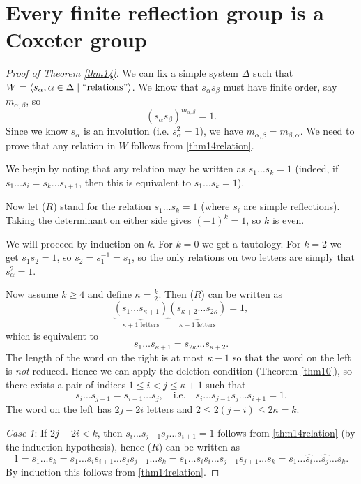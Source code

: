 \section{Every finite reflection group is a Coxeter group}

\begin{proof}[Proof of Theorem \ref{thm14}]
We can fix a simple system $\Delta$ such that
$W = \langle s_\alpha, \alpha \in \Delta \mid \text{``relations''} \rangle$. We know
that $s_\alpha s_\beta$ must have finite order, say $m_{\alpha,\beta}$, so
\begin{equation} \label{thm14relation}
(s_\alpha s_\beta)^{m_{\alpha, \beta}} = 1. %
\end{equation}
Since we know $s_\alpha$ is an
involution (i.e. $s_\alpha^2 = 1$), we have $m_{\alpha, \beta} = m_{\beta, \alpha}$.
We need to prove that any relation in $W$ follows from \eqref{thm14relation}.

We begin by noting that any relation may be written as $s_1 \dots s_k = 1$
(indeed, if $s_1 \dots s_i = s_k \dots s_{i+1}$, then this is equivalent to
$s_1 \dots s_k = 1$).

Now let ($R$) stand for the relation $s_1 \dots s_k = 1$ (where $s_i$ are simple
reflections). Taking the determinant on either side gives $(-1)^k = 1$, so $k$
is even.

We will proceed by induction on $k$. For $k = 0$ we get a tautology.
For $k = 2$ we get $s_1 s_2 = 1$, so $s_2 = s_1^{-1} = s_1$, so the only
relations on two letters are simply that $s_\alpha^2 = 1$.

Now assume $k \geq 4$ and define $\kappa = \frac{k}{2}$. Then ($R$) can be
written as
\[
    \underbrace{(s_1 \dots s_{\kappa+1})}_{\kappa+1 \text{ letters}}
    \underbrace{(s_{\kappa+2} \dots s_{2 \kappa})}_{\kappa-1 \text{ letters}} = 1,
\]
which is equivalent to
\[
    s_1 \dots s_{\kappa+1} = s_{2 \kappa} \dots s_{\kappa + 2}.
\]
The length of the word on the right is at most $\kappa-1$ so that the word on
the left is {\em not} reduced. Hence we can apply the deletion condition (Theorem
\ref{thm10}), so there exists a pair of indices $1 \leq i < j \leq \kappa+1$
such that
\[
    s_i \dots s_{j-1} = s_{i+1} \dots s_j,
\quad
\text{i.e.}
\quad
    s_i \dots s_{j-1} s_j \dots s_{i+1} = 1.
\]
The word on the left has $2j-2i$ letters and $2 \leq 2(j-i) \leq 2\kappa = k$.

{\em Case 1}: If $2j-2i < k$, then $s_i \dots s_{j-1} s_j \dots s_{i+1} = 1$
follows from \eqref{thm14relation} (by the induction hypothesis), hence ($R$)
can be written as
\[
    1 = s_1 \dots s_k = s_1 \dots s_i s_{i+1} \dots s_j s_{j+1} \dots s_k
    = s_1 \dots s_i s_i \dots s_{j-1} s_{j+1} \dots s_k
    = s_1 \dots \hat{s_i} \dots \hat{s_j} \dots s_k.
\]
By induction this follows from \eqref{thm14relation}.


\end{proof}
